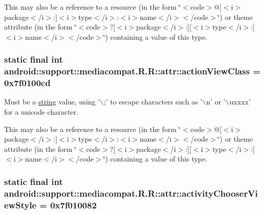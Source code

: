 This may also be a reference to a resource (in the form \char`\"{}$<$code$>$@\mbox{[}$<$i$>$package$<$/i$>$:\mbox{]}$<$i$>$type$<$/i$>$:$<$i$>$name$<$/i$>$$<$/code$>$\char`\"{}) or theme attribute (in the form \char`\"{}$<$code$>$?\mbox{[}$<$i$>$package$<$/i$>$:\mbox{]}\mbox{[}$<$i$>$type$<$/i$>$:\mbox{]}$<$i$>$name$<$/i$>$$<$/code$>$\char`\"{}) containing a value of this type. \hypertarget{classandroid_1_1support_1_1mediacompat_1_1_r_1_1attr_32265aadffc15f29c8e498f801be520f}{
\subsubsection[{actionViewClass}]{\setlength{\rightskip}{0pt plus 5cm}static final int android::support::mediacompat.R.R::attr::actionViewClass = 0x7f0100cd}}
\label{classandroid_1_1support_1_1mediacompat_1_1_r_1_1attr_32265aadffc15f29c8e498f801be520f}


Must be a \hyperlink{classandroid_1_1support_1_1mediacompat_1_1_r_1_1string}{string} value, using '$\backslash$;' to escape characters such as '$\backslash$n' or '$\backslash$uxxxx' for a unicode character. 

This may also be a reference to a resource (in the form \char`\"{}$<$code$>$@\mbox{[}$<$i$>$package$<$/i$>$:\mbox{]}$<$i$>$type$<$/i$>$:$<$i$>$name$<$/i$>$$<$/code$>$\char`\"{}) or theme attribute (in the form \char`\"{}$<$code$>$?\mbox{[}$<$i$>$package$<$/i$>$:\mbox{]}\mbox{[}$<$i$>$type$<$/i$>$:\mbox{]}$<$i$>$name$<$/i$>$$<$/code$>$\char`\"{}) containing a value of this type. \hypertarget{classandroid_1_1support_1_1mediacompat_1_1_r_1_1attr_ba38e07a02355d8366c34d54e83953cc}{
\subsubsection[{activityChooserViewStyle}]{\setlength{\rightskip}{0pt plus 5cm}static final int android::support::mediacompat.R.R::attr::activityChooserViewStyle = 0x7f010082}}
\label{classandroid_1_1support_1_1mediacompat_1_1_r_1_1attr_ba38e07a02355d8366c34d54e83953cc}


